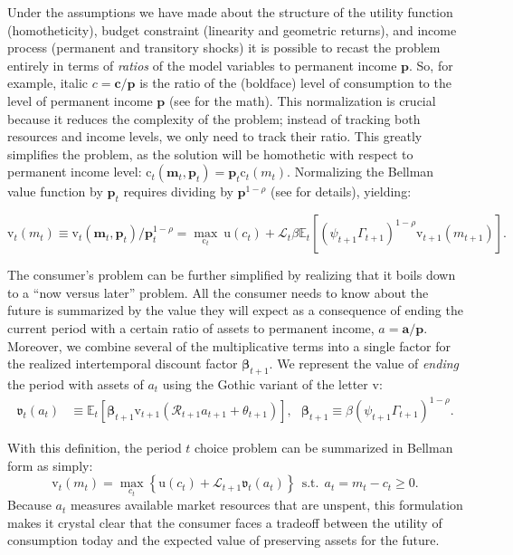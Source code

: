 \documentclass{article}
\newcommand{\CRRA}{\rho}
\newcommand{\uFunc}{\mathrm{u}}
\newcommand{\cLvl}{\mathbf{c}}
\newcommand{\mLvl}{\mathbf{m}}
\newcommand{\aLvl}{\mathbf{a}}
\newcommand{\Rport}{\mathcal{R}}
\newcommand{\pLvl}{\mathbf{p}}
\newcommand{\DiscFac}{\beta}
\newcommand{\cFunc}{\mathrm{c}}
\newcommand{\vFunc}{\mathrm{v}}
\newcommand{\Alive}{\mathcal{L}}
\newcommand{\Ex}{\mathbb{E}}
\newcommand{\permGroFac}{\Gamma}
\newcommand{\permShk}{\psi}
\newcommand{\tranShk}{\theta}
\newcommand{\cNrm}{c}
\newcommand{\mNrm}{m}
\newcommand{\aNrm}{a}
\begin{document}
Under the assumptions we have made about the structure of the utility function (homotheticity), budget constraint (linearity and geometric returns), and income process (permanent and transitory shocks) it is possible to recast the problem entirely in terms of \textit{ratios} of the model variables to permanent income $\pLvl$.
So, for example, italic $\cNrm = \cLvl/\pLvl$ is the ratio of the (boldface) level of consumption to the level of permanent income $\pLvl$ (see \cite{BufferStockTheory} for the math). This normalization is crucial because it reduces the complexity of the problem; instead of tracking both resources and income levels, we only need to track their ratio.
This greatly simplifies the problem, as the solution will be homothetic with respect to permanent income level: $\pmb{\cFunc}_t(\mLvl_t, \pLvl_t) = \pLvl_t \cFunc_t(\mNrm_t)$.
Normalizing the Bellman value function by $\pLvl_t$ requires dividing by $\pLvl^{1 -\CRRA}$ (see \cite{BufferStockTheory} for details), yielding:

\begin{equation}
\label{eq:normbellman}
\vFunc_{t}(\mNrm_{t}) \equiv \pmb{\vFunc}_{t}(\mLvl_{t},\pLvl_{t}) / \pLvl_t^{1-\CRRA} = \max_{\cFunc_{t}} ~ \uFunc(\cNrm_{t}) + \Alive_t \DiscFac  \Ex_{t}\left[ (\permShk_{t+1} \permGroFac_{t+1})^{1-\CRRA} \vFunc_{t+1}(\mNrm_{t+1}) \right].
\end{equation}

The consumer's problem can be further simplified by realizing that it boils down to a ``now versus later'' problem.
All the consumer needs to know about the future is summarized by the value they will expect as a consequence of ending the current period with a certain ratio of assets to permanent income, $\aNrm = \aLvl/\pLvl$.
Moreover, we combine several of the multiplicative terms into a single factor for the realized intertemporal discount factor $\pmb{\DiscFac}_{t+1}$.
We represent the value of \textit{ending} the period with assets of $\aNrm_t$ using the Gothic variant of the letter $\vFunc$:
\begin{align}
    \mathfrak{v}_{t}(\aNrm_{t}) & \equiv \Ex_{t}[\pmb{\DiscFac}_{t+1}\vFunc_{t+1}(\Rport_{t+1} \aNrm_{t+1} + \tranShk_{t+1})], ~~~ \pmb{\DiscFac}_{t+1} \equiv {\beta} (\permShk_{t+1} \permGroFac_{t+1})^{1-\CRRA}.
\end{align}

With this definition, the period $t$ choice problem can be summarized in Bellman form as simply:
\begin{equation}
\vFunc_t(\mNrm_t) = \max_{\cNrm_t} \left\{ \uFunc(\cNrm_{t}) + \Alive_{t+1} \mathfrak{v}_{t}(\aNrm_{t}) \right\} ~~\text{s.t.} ~~ a_t = m_t - c_t \geq 0.
\end{equation}
Because $\aNrm_t$ measures available market resources that are unspent, this formulation makes it crystal clear that the consumer faces a tradeoff between the utility of consumption today and the expected value of preserving assets for the future.
\end{document}
